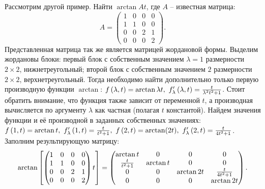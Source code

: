 		Рассмотрим другой пример. Найти $\arctan{At}$, где $A$ -- известная матрица:
		\[ A = \begin{pmatrix} 1 & 0 & 0 & 0 \\ 1 & 1 & 0 & 0 \\ 0 & 0 & 2 & 1 \\ 0 & 0 & 0 & 2 \end{pmatrix}. \]
		Представленная матрица так же является матрицей жордановой формы. Выделим жордановы блоки: первый блок с собственным значением $\lambda = 1$ размерности $2 \times 2$, нижнетреугольный; второй блок с собственным значением $2$ размерности $2 \times 2$, верхнетреугольный. Тогда необходимо найти дополнительно только первую производную функции $\arctan$: $f\left( \lambda, t \right) = \arctan{\lambda t}, ~ f'_{\lambda} \left( \lambda, t \right) = \frac{t}{\lambda^2 t^2 + 1}$. Стоит обратить внимание, что функция также зависит от переменной $t$, а производная вычисляется по аргументу $\lambda$ как частная (полагая $t$ константой). Найдем значения функции и её производной в заданных собственных значениях: $f\left( 1, t \right) = \arctan{t}, ~ f'_{\lambda}\left( 1, t \right) = \frac{t}{t^2 + 1}, ~ f\left( 2, t \right) = \arctan(2t), ~ f'_{\lambda}\left( 2, t \right) = \frac{t}{4t^2 + 1}$. Заполним результирующую матрицу:
		\[ \arctan\left[ \begin{pmatrix} 1 & 0 & 0 & 0 \\ 1 & 1 & 0 & 0 \\ 0 & 0 & 2 & 1 \\ 0 & 0 & 0 & 2 \end{pmatrix} t \right] = \begin{pmatrix} \arctan{t} & 0 & 0 & 0 \\ \frac{t}{t^2 + 1} & \arctan{t} & 0 & 0 \\ 0 & 0 & \arctan{2t} & \frac{t}{4t^2 + 1} \\ 0 & 0 & 0 & \arctan{2t} \end{pmatrix}. \]
